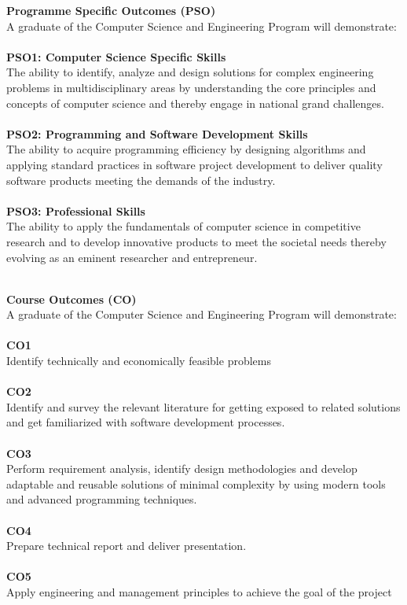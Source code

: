 \documentclass[12pt,a4paper,titlepage]{report}
\begin{document}
	\textbf{Programme Specific Outcomes (PSO)} \\
	A graduate of the Computer Science and Engineering Program will demonstrate: \\ \\
	\textbf{PSO1: Computer Science Specific Skills} \\
	The ability to identify, analyze and design solutions for complex engineering problems in multidisciplinary areas by understanding the core principles and concepts of computer science and thereby engage in national grand challenges. \\ \\
	\textbf{PSO2: Programming and Software Development Skills} \\
	The ability to acquire programming efficiency by designing algorithms and applying standard practices in software project development to deliver quality software products meeting the demands of the industry. \\ \\
	\textbf{PSO3: Professional Skills} \\
	The ability to apply the fundamentals of computer science in competitive research and to develop innovative products to meet the societal needs thereby evolving as an eminent researcher and entrepreneur. \\ \\
    \clearpage

	\textbf{Course Outcomes (CO)} \\
	A graduate of the Computer Science and Engineering Program will demonstrate: \\ \\
	\textbf{CO1} \\
	Identify technically and economically feasible problems \\ \\
	\textbf{CO2} \\
Identify and survey the relevant literature for getting exposed to related solutions and get familiarized with software development processes. \\ \\
	\textbf{CO3} \\
	Perform requirement analysis, identify design methodologies and develop adaptable and
reusable solutions of minimal complexity by using modern tools and advanced programming techniques. \\ \\
\textbf{CO4} \\
	Prepare technical report and deliver presentation. \\ \\
    \textbf{CO5} \\
	Apply engineering and management principles to achieve the goal of the project\\ \\
    \clearpage
	
\end{document}
